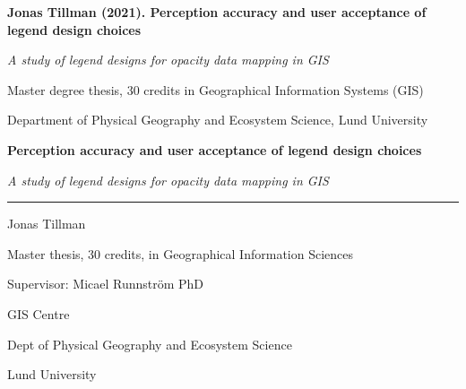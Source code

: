 
   
% 


\setcounter{page}{2}


\textbf{Jonas Tillman (2021). Perception accuracy and user acceptance of legend design choices}

\emph{A study of legend designs for opacity data mapping in GIS}

Master degree thesis, 30 credits in Geographical Information Systems (GIS) 

Department of Physical Geography and Ecosystem Science, Lund University

\newpage



\begin{center}
    \vspace*{1cm}
        
    \Huge
    \textbf{Perception accuracy and user acceptance of legend design choices}
    
    \Large
    \emph{A study of legend designs for opacity data mapping in GIS}
        
    \vspace{5cm}
        
    \rule{15cm}{1.0pt}

    \Large
    Jonas Tillman

    Master thesis, 30 credits, in Geographical Information Sciences
    
    \vspace{2cm}
    
    Supervisor: Micael Runnström PhD

    GIS Centre
    
    Dept of Physical Geography and Ecosystem Science
    
    Lund University
                    
\end{center}

\newpage

